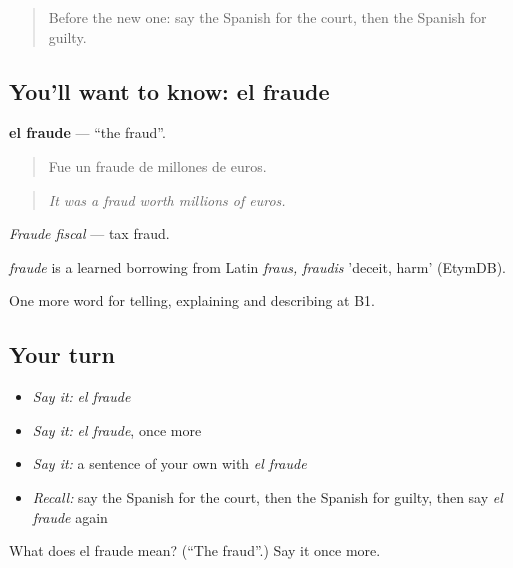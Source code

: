 \label{lesson:ES-C626-fraude}



\begin{quote}
Before the new one: say the Spanish for the court, then the Spanish for guilty.
\end{quote}

\subsection*{You'll want to know: el fraude}
\textbf{el fraude} — \textquotedblleft{}the fraud\textquotedblright{}.

\begin{quote}
Fue un fraude de millones de euros.
\end{quote}

\begin{quote}
\emph{It was a fraud worth millions of euros.}
\end{quote}

\emph{Fraude fiscal} — tax fraud.

\begin{cousinweb}
\emph{fraude} is a learned borrowing from Latin \emph{fraus, fraudis} 'deceit, harm' (EtymDB).
\end{cousinweb}

\begin{grammarlens}[title={What you've built}]
One more word for telling, explaining and describing at B1.
\end{grammarlens}

\subsection*{Your turn}
\begin{itemize}
\raggedright
  \item \emph{Say it:} \emph{el fraude}
  \item \emph{Say it:} \emph{el fraude}, once more
  \item \emph{Say it:} a sentence of your own with \emph{el fraude}
  \item \emph{Recall:} say the Spanish for the court, then the Spanish for guilty, then say \emph{el fraude} again
\end{itemize}

\begin{tcolorbox}[breakable,colback=teal!4,colframe=teal!35!black,title={Before you move on}]
What does el fraude mean? (\textquotedblleft{}The fraud\textquotedblright{}.) Say it once more.
\end{tcolorbox}
